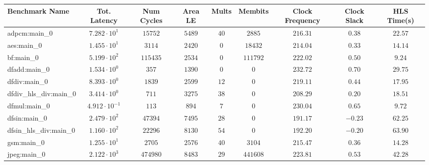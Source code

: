\begin{tabular}{|l|c|c|c|c|c|c|c|c|}
\hline
Benchmark Name          & Tot. Latency            & Num Cycles & Area LE   & Mults   & Membits    & Clock Frequency & Clock Slack & HLS Time(s) \\
\hline
adpcm:main\_0           & $ 7.282 \cdot 10^{1}  $ & $ 15752  $ & $ 5489  $ & $ 40  $ & $ 2885   $ & $ 216.31      $ & $ 0.38    $ & $ 22.57   $ \\
aes:main\_0             & $ 1.455 \cdot 10^{1}  $ & $ 3114   $ & $ 2420  $ & $ 0   $ & $ 18432  $ & $ 214.04      $ & $ 0.33    $ & $ 14.14   $ \\
bf:main\_0              & $ 5.199 \cdot 10^{2}  $ & $ 115435 $ & $ 2534  $ & $ 0   $ & $ 111792 $ & $ 222.02      $ & $ 0.50    $ & $ 9.24    $ \\
dfadd:main\_0           & $ 1.534 \cdot 10^{0}  $ & $ 357    $ & $ 1390  $ & $ 0   $ & $ 0      $ & $ 232.72      $ & $ 0.70    $ & $ 29.75   $ \\
dfdiv:main\_0           & $ 8.393 \cdot 10^{0}  $ & $ 1839   $ & $ 2599  $ & $ 12  $ & $ 0      $ & $ 219.11      $ & $ 0.44    $ & $ 17.95   $ \\
dfdiv\_hls\_div:main\_0 & $ 3.414 \cdot 10^{0}  $ & $ 711    $ & $ 3275  $ & $ 38  $ & $ 0      $ & $ 208.29      $ & $ 0.20    $ & $ 18.51   $ \\
dfmul:main\_0           & $ 4.912 \cdot 10^{-1} $ & $ 113    $ & $ 894   $ & $ 7   $ & $ 0      $ & $ 230.04      $ & $ 0.65    $ & $ 9.72    $ \\
dfsin:main\_0           & $ 2.479 \cdot 10^{2}  $ & $ 47394  $ & $ 7495  $ & $ 28  $ & $ 0      $ & $ 191.17      $ & $ -0.23   $ & $ 62.25   $ \\
dfsin\_hls\_div:main\_0 & $ 1.160 \cdot 10^{2}  $ & $ 22296  $ & $ 8130  $ & $ 54  $ & $ 0      $ & $ 192.20      $ & $ -0.20   $ & $ 63.90   $ \\
gsm:main\_0             & $ 1.255 \cdot 10^{1}  $ & $ 2705   $ & $ 2576  $ & $ 40  $ & $ 3104   $ & $ 215.47      $ & $ 0.36    $ & $ 14.28   $ \\
jpeg:main\_0            & $ 2.122 \cdot 10^{3}  $ & $ 474980 $ & $ 8483  $ & $ 29  $ & $ 441608 $ & $ 223.81      $ & $ 0.53    $ & $ 42.28   $ \\

\end{tabular}
